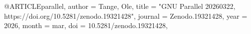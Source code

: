 
@ARTICLE{parallel,
       author = {{Tange}, Ole},
        title = "{GNU Parallel 20260322, https://doi.org/10.5281/zenodo.19321428}",
      journal = {Zenodo.19321428},
         year = 2026,
        month = mar,
          doi = {10.5281/zenodo.19321428},
}

